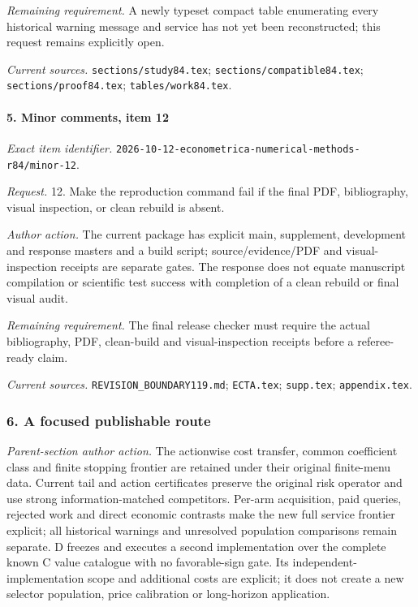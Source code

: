 \par\emph{Remaining requirement.} A newly typeset compact table enumerating every historical warning message and service has not yet been reconstructed; this request remains explicitly open.

\par\emph{Current sources.} \nolinkurl{sections/study84.tex}; \nolinkurl{sections/compatible84.tex}; \nolinkurl{sections/proof84.tex}; \nolinkurl{tables/work84.tex}.

\paragraph{5. Minor comments, item 12}

\emph{Exact item identifier.} \nolinkurl{2026-10-12-econometrica-numerical-methods-r84/minor-12}.

\par\emph{Request.} 12. Make the reproduction command fail if the final PDF, bibliography, visual inspection, or clean rebuild is absent.

\par\emph{Author action.} The current package has explicit main, supplement, development and response masters and a build script; source/\allowbreak{}evidence/\allowbreak{}PDF and visual-inspection receipts are separate gates. The response does not equate manuscript compilation or scientific test success with completion of a clean rebuild or final visual audit.

\par\emph{Remaining requirement.} The final release checker must require the actual bibliography, PDF, clean-build and visual-inspection receipts before a referee-ready claim.

\par\emph{Current sources.} \nolinkurl{REVISION_BOUNDARY119.md}; \nolinkurl{ECTA.tex}; \nolinkurl{supp.tex}; \nolinkurl{appendix.tex}.

\subsubsection{6. A focused publishable route}

\emph{Parent-section author action.} The actionwise cost transfer, common coefficient class and finite stopping frontier are retained under their original finite-menu data. Current tail and action certificates preserve the original risk operator and use strong information-matched competitors. Per-arm acquisition, paid queries, rejected work and direct economic contrasts make the new full service frontier explicit; all historical warnings and unresolved population comparisons remain separate. D freezes and executes a second implementation over the complete known C value catalogue with no favorable-sign gate. Its independent-implementation scope and additional costs are explicit; it does not create a new selector population, price calibration or long-horizon application.

